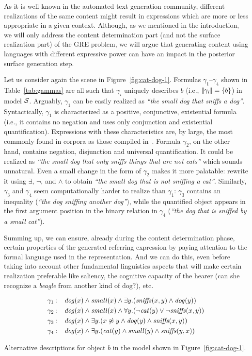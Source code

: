 As it is well known in the automated text
generation community, different realizations of the same content
might result in expressions which are more or less appropriate in a given context. Although,
as we mentioned in the introduction, we will only address the
content determination part (and not the surface realization part)
of the GRE problem, we will argue that generating content using languages with
different expressive power can have an impact in the
posterior surface generation step.

Let us consider again the scene in Figure~\ref{fig:cat-dog-1}.
Formulas $\gamma_1$--$\gamma_4$ shown in Table~\ref{tab:gammas}
are all such that $\gamma_i$ uniquely describes $b$
(i.e., $|\!|\gamma_i|\!| = \{b\}$) in model $\mathcal{S}$.
Arguably, $\gamma_1$ can be easily realized as \emph{``the small dog
that sniffs a dog''}. Syntactically, $\gamma_1$ is characterized as
a positive, conjunctive, existential formula (i.e., it contains no
negation and uses only conjunction and existential quantification).
Expressions with these characteristics are, by large, the most
commonly found in corpora as those compiled
in~\cite{viet:algo06,deem:buil06,dale:refe09}. Formula $\gamma_2$, on the
other hand, contains negation, disjunction and universal
quantification. It could be realized as \emph{``the small dog that
only sniffs things that are not cats''} which sounds unnatural. Even
a small change in the form of $\gamma_2$ makes it more palatable:
rewrite it using $\exists$, $\lnot$, and $\land$ to obtain
\emph{``the small dog that is not sniffing a cat''}. Similarly,
 $\gamma_3$ and $\gamma_4$ seem computationally harder to
realize than $\gamma_1$: $\gamma_3$ contains an inequality
(\emph{``the dog sniffing another dog''}), while the quantified
object appears in the first argument position in the binary relation
in $\gamma_4$ (\emph{``the dog that is sniffed by a small cat''}).

Summing up, we can ensure, already during the content determination
phase, certain properties of the generated referring expression by
paying attention to the formal language used in the representation.
And we can do this, even before taking into account other
fundamental linguistics aspects that will make certain realization
preferable like saliency, the cognitive capacity of the hearer (can
she recognize a \emph{beagle} from another kind of dog?), etc.

%
\begin{table}
$$
\begin{array}{cl}
 \gamma_1: & \mathit{dog}(x) \land \mathit{small}(x) \land
   \exists y . (\mathit{sniffs}(x,y) \land \mathit{dog}(y))\\[3pt]
  \gamma_2: & \mathit{dog}(x) \land \mathit{small}(x) \land
  \forall y . (\neg \mathit{cat}(y) \lor \neg \mathit{sniffs}(x,y))\\[3pt]
  \gamma_3: & \mathit{dog}(x) \land
  \exists y . (x \not\approx y \land \mathit{dog}(y)  \land \mathit{sniffs}(x,y))\\[3pt]
  \gamma_4: & \mathit{dog}(x) \land
  \exists y . (\mathit{cat}(y) \land \mathit{small}(y) \land \mathit{sniffs}(y,x))
 \end{array}
$$
\caption{Alternative descriptions for object $b$ in the model shown in Figure~\ref{fig:cat-dog-1}.}\label{tab:gammas}
\end{table}
%


